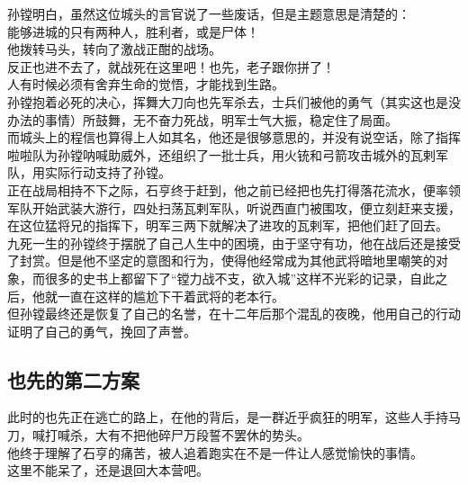 \begin{multicols}{\theparacolNo}
孙镗明白，虽然这位城头的言官说了一些废话，但是主题意思是清楚的：\\

能够进城的只有两种人，胜利者，或是尸体！\\

他拨转马头，转向了激战正酣的战场。\\

反正也进不去了，就战死在这里吧！也先，老子跟你拼了！\\

人有时候必须有舍弃生命的觉悟，才能找到生路。\\

孙镗抱着必死的决心，挥舞大刀向也先军杀去，士兵们被他的勇气（其实这也是没办法的事情）所鼓舞，无不奋力死战，明军士气大振，稳定住了局面。\\

而城头上的程信也算得上人如其名，他还是很够意思的，并没有说空话，除了指挥啦啦队为孙镗呐喊助威外，还组织了一批士兵，用火铳和弓箭攻击城外的瓦剌军队，用实际行动支持了孙镗。\\

正在战局相持不下之际，石亨终于赶到，他之前已经把也先打得落花流水，便率领军队开始武装大游行，四处扫荡瓦剌军队，听说西直门被围攻，便立刻赶来支援，在这位猛将兄的指挥下，明军三两下就解决了进攻的瓦剌军，把他们赶了回去。\\

九死一生的孙镗终于摆脱了自己人生中的困境，由于坚守有功，他在战后还是接受了封赏。但是他不坚定的意图和行为，使得他经常成为其他武将暗地里嘲笑的对象，而很多的史书上都留下了“镗力战不支，欲入城”这样不光彩的记录，自此之后，他就一直在这样的尴尬下干着武将的老本行。\\

但孙镗最终还是恢复了自己的名誉，在十二年后那个混乱的夜晚，他用自己的行动证明了自己的勇气，挽回了声誉。\\

\subsection{也先的第二方案}
此时的也先正在逃亡的路上，在他的背后，是一群近乎疯狂的明军，这些人手持马刀，喊打喊杀，大有不把他碎尸万段誓不罢休的势头。\\

他终于理解了石亨的痛苦，被人追着跑实在不是一件让人感觉愉快的事情。\\

这里不能呆了，还是退回大本营吧。\\


\end{multicols}
